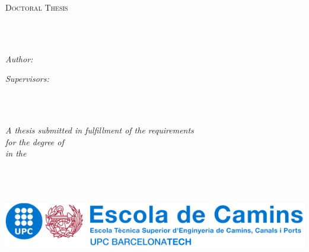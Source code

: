 \documentclass[
11pt,                   %
english,                %
singlespacing,          %
headsepline,            %
]{MastersDoctoralThesis}
\date{September 29, 2022}
\author{Miguel \textsc{Masó}} %
\begin{document}
\frontmatter %

\pagestyle{plain} %



\begin{titlepage}
\begin{center}

\vspace*{.06\textheight}
{\scshape\LARGE \univname\par}\vspace{1.5cm} %
\textsc{\Large Doctoral Thesis}\\[0.5cm] %

\HRule \\[0.4cm] %
{\huge \bfseries \ttitle\par}\vspace{0.4cm} %
\HRule \\[1.5cm] %
 
\begin{minipage}[t]{0.4\textwidth}
\begin{flushleft} \large
\emph{Author:}\\
\href{https://directori.upc.edu/directori/dadesPersona.jsp?id=1115243}{\authorname}
\end{flushleft}
\end{minipage}
\begin{minipage}[t]{0.4\textwidth}
\begin{flushright} \large
\emph{Supervisors:} \\
\href{http://www.cimne.com/eo}{\supname} \\
\href{https://www.cimne.com/1898/2181/people/directory}{\cosupname}
\end{flushright}
\end{minipage}\\[.3cm]
 
\vfill

\large \textit{A thesis submitted in fulfillment of the requirements\\ for the degree of \degreename}\\[0.3cm] %
\textit{in the}\\[0.3cm]
\groupname\\\deptname\\[.3cm] %
 
\vfill

{\large \printdate}\\[1cm]
\href{https://camins.upc.edu/}{
\includegraphics[width=.6\textwidth]{img/logo_caminos.png}
}
\vfill
\end{center}
\end{titlepage}
\end{document}
